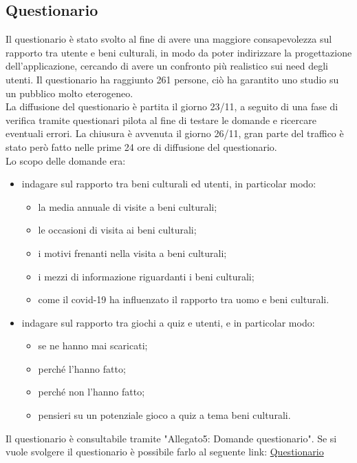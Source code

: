 \documentclass{article}
\begin{document}
\subsection{Questionario}
Il questionario è stato svolto al fine di avere una maggiore consapevolezza sul rapporto tra utente e beni culturali, in modo da poter indirizzare la progettazione dell'applicazione, cercando di avere un confronto più realistico sui need degli utenti. Il questionario ha raggiunto 261 persone, ciò ha garantito uno studio su un pubblico molto eterogeneo.
\\\indent 
La diffusione del questionario è partita il giorno 23/11, a seguito di una fase di verifica tramite questionari pilota al fine di testare le domande e ricercare eventuali errori. La chiusura è avvenuta il giorno 26/11, gran parte del traffico è stato però fatto nelle prime 24 ore di diffusione del questionario.\\
Lo scopo delle domande era:
\begin{itemize}
\item indagare sul rapporto tra beni culturali ed utenti, in particolar modo:
\begin{itemize}
\item la media annuale di visite a beni culturali;
\item le occasioni di visita ai beni culturali;
\item i motivi frenanti nella visita a beni culturali;
\item i mezzi di informazione riguardanti i beni culturali;
\item come il covid-19 ha influenzato il rapporto tra uomo e beni culturali.
\end{itemize}
\item indagare sul rapporto tra giochi a quiz e utenti, e in particolar modo:
\begin{itemize}
\item se ne hanno mai scaricati;
\item perché l’hanno fatto;
\item perché non l’hanno fatto;
\item pensieri su un potenziale gioco a quiz a tema beni culturali.
\end{itemize}
\end{itemize}
Il questionario è consultabile tramite "Allegato5: Domande questionario"\cite{Allegato5}. Se si vuole svolgere il questionario è possibile farlo al seguente link: \href{https://docs.google.com/forms/d/e/1FAIpQLSeiq-80ZoPFimE0_AQif0h2rCf19phYsfOJ1wEj9B0JT0u5WQ/viewform}{Questionario}\\
\end{document}

